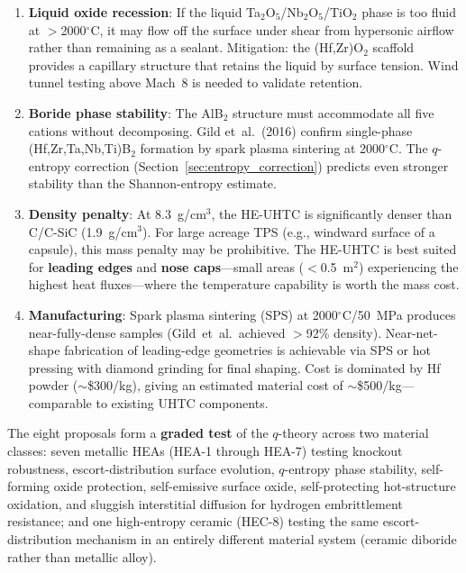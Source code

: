 \documentclass[12pt,letterpaper]{article}
\theoremstyle{definition}
\begin{document}
\begin{enumerate}
  \item \textbf{Liquid oxide recession}: If the liquid Ta$_2$O$_5$/Nb$_2$O$_5$/TiO$_2$ phase is too fluid at $>$2000$^\circ$C, it may flow off the surface under shear from hypersonic airflow rather than remaining as a sealant.  Mitigation: the (Hf,Zr)O$_2$ scaffold provides a capillary structure that retains the liquid by surface tension.  Wind tunnel testing above Mach~8 is needed to validate retention.

  \item \textbf{Boride phase stability}: The AlB$_2$ structure must accommodate all five cations without decomposing.  Gild et~al.\ (2016) confirm single-phase (Hf,Zr,Ta,Nb,Ti)B$_2$ formation by spark plasma sintering at 2000$^\circ$C\@.  The $q$-entropy correction (Section~\ref{sec:entropy_correction}) predicts even stronger stability than the Shannon-entropy estimate.

  \item \textbf{Density penalty}: At 8.3~g/cm$^3$, the HE-UHTC is significantly denser than C/C-SiC (1.9~g/cm$^3$).  For large acreage TPS (e.g., windward surface of a capsule), this mass penalty may be prohibitive.  The HE-UHTC is best suited for \textbf{leading edges} and \textbf{nose caps}---small areas ($<$0.5~m$^2$) experiencing the highest heat fluxes---where the temperature capability is worth the mass cost.

  \item \textbf{Manufacturing}: Spark plasma sintering (SPS) at 2000$^\circ$C/50~MPa produces near-fully-dense samples (Gild~et~al.\ achieved $>$92\% density).  Near-net-shape fabrication of leading-edge geometries is achievable via SPS or hot pressing with diamond grinding for final shaping.  Cost is dominated by Hf powder ($\sim$\$300/kg), giving an estimated material cost of $\sim$\$500/kg---comparable to existing UHTC components.
\end{enumerate}

The eight proposals form a \textbf{graded test} of the $q$-theory across two material classes: seven metallic HEAs (HEA-1 through HEA-7) testing knockout robustness, escort-distribution surface evolution, $q$-entropy phase stability, self-forming oxide protection, self-emissive surface oxide, self-protecting hot-structure oxidation, and sluggish interstitial diffusion for hydrogen embrittlement resistance; and one high-entropy ceramic (HEC-8) testing the same escort-distribution mechanism in an entirely different material system (ceramic diboride rather than metallic alloy).
\end{document}
